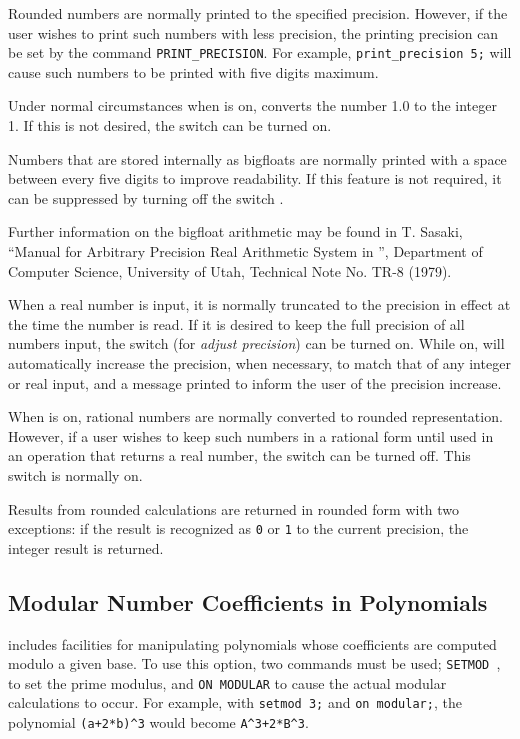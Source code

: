 \hypertarget{command:PRINT_PRECISION}{}
Rounded numbers are normally printed to the specified precision.  However,
if the user wishes to print such numbers with less precision, the printing
precision can be set by the command \texttt{PRINT\_PRECISION}.
 For example, \texttt{print\_precision 5;} will
cause such numbers to be printed with five digits maximum.

\hypertarget{switch:NOCONVERT}{}
Under normal circumstances when  is on, {\REDUCE} converts the
number 1.0 to the integer 1.  If this is not desired, the switch
 can be turned on.

\hypertarget{switch:BFSPACE}{}
Numbers that are stored internally as bigfloats are normally printed with
a space between every five digits to improve readability.  If this
feature is not required, it can be suppressed by turning off the switch
.

Further information on the bigfloat arithmetic may be found in T. Sasaki,
``Manual for Arbitrary Precision Real Arithmetic System in {\REDUCE}'',
Department of Computer Science, University of Utah, Technical Note No.
TR-8 (1979).

\hypertarget{switch:ADJPREC}{}
When a real number is input, it is normally truncated to the precision in
effect at the time the number is read.  If it is desired to keep the full
precision of all numbers input, the switch 
(for \emph{adjust precision}) can be turned on.  While on, 
will automatically increase the precision, when necessary, to match that
of any integer or real input, and a message printed to inform the user of
the precision increase.

\hypertarget{switch:ROUNDALL}{}
When  is on, rational numbers are normally converted to
rounded representation.  However, if a user wishes to keep such numbers in
a rational form until used in an operation that returns a real number,
the switch  can be turned off.  This
switch is normally on.

Results from rounded calculations are returned in rounded form with two
exceptions: if the result is recognized as \texttt{0} or \texttt{1} to the
current precision, the integer result is returned.

\subsection{Modular Number Coefficients in Polynomials}
\hypertarget{switch:MODULAR}{}
\hypertarget{command:SETMOD}{}
{\REDUCE} includes facilities for manipulating polynomials whose
coefficients are computed modulo a given base.  To use this option, two
commands must be used; \texttt{SETMOD }, to set
the prime modulus, and \texttt{ON MODULAR} to cause the
actual modular calculations to occur.
For example, with \texttt{setmod 3;} and \texttt{on modular;}, the polynomial
\texttt{(a+2*b)\textasciicircum3} would become 
\texttt{A\textasciicircum3+2*B\textasciicircum3}.

